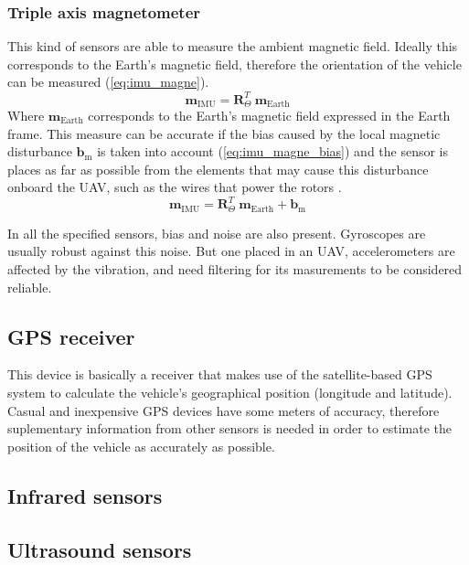\documentclass[journal]{IEEEtran}
\newcommand*{\subb}[1]{_{\mathrm{#1}}}
\begin{document}
		\subsubsection{Triple axis magnetometer} This kind of sensors are able to measure the ambient magnetic field. Ideally this corresponds to the Earth's magnetic field, therefore the orientation of the vehicle can be measured (\ref{eq:imu_magne}).
		\begin{equation} \label{eq:imu_magne}
		\bm{m}\subb{IMU}= \bm{R}^T_\Theta \  \bm{m}\subb{Earth}
		\end{equation}
		Where $\bm{m}\subb{Earth}$ corresponds to the Earth's magnetic field expressed in the Earth frame. This measure can be accurate if the bias caused by the local magnetic disturbance $\bm{b}\subb{m}$ is taken into account (\ref{eq:imu_magne_bias}) and the sensor is places as far as possible from the elements that may cause this disturbance onboard the UAV, such as the wires that power the rotors \cite{modelling_control_mahony}.
		\begin{equation} \label{eq:imu_magne_bias}
		\bm{m}\subb{IMU}= \bm{R}^T_\Theta \  \bm{m}\subb{Earth} + \bm{b}\subb{m}
		\end{equation}
		
		In all the specified sensors, bias and noise are also present. Gyroscopes are usually robust against this noise. But one placed in an UAV, accelerometers are affected by the vibration, and need filtering for its masurements to be considered reliable.
		
		\subsection{GPS receiver}
		This device is basically a receiver that makes use of the satellite-based GPS system to calculate the vehicle's geographical position (longitude and latitude). Casual and inexpensive GPS devices have some meters of accuracy, therefore suplementary information from other sensors is needed in order to estimate the position of the vehicle as accurately as possible.
		
		\subsection{Infrared sensors}
		
		\subsection{Ultrasound sensors}
	
\end{document}
